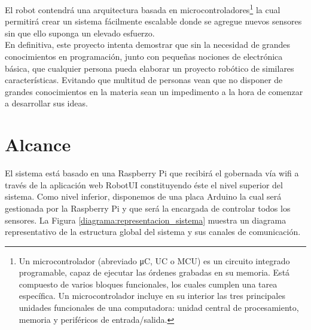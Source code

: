 El robot contendrá una arquitectura basada en microcontroladores\footnote{Un microcontrolador (abreviado μC, UC o MCU) es un circuito integrado programable, capaz de 
ejecutar las órdenes grabadas en su memoria. Está compuesto de varios bloques funcionales, los cuales cumplen una tarea específica. Un microcontrolador incluye en su interior las
tres principales unidades funcionales de una computadora: unidad central de procesamiento, memoria y periféricos de entrada/salida. } la cual permitirá crear un sistema fácilmente escalable donde se agregue nuevos sensores sin que ello suponga 
un elevado esfuerzo.\\

En definitiva, este proyecto intenta demostrar que sin la necesidad de grandes conocimientos en programación, junto con pequeñas nociones de electrónica básica, que cualquier
persona pueda elaborar un proyecto robótico de similares características. Evitando que multitud de personas vean que no disponer de grandes conocimientos en la materia sean un
impedimento a la hora de comenzar a desarrollar sus ideas.\\

\section{Alcance}

El sistema está basado en una Raspberry Pi que recibirá el gobernada vía wifi a través de la aplicación web RobotUI constituyendo éste el nivel superior del sistema. Como nivel inferior, 
disponemos de una placa Arduino la cual será gestionada por la Raspberry Pi y que será la encargada de controlar todos los sensores. La Figura \ref{diagrama:representacion_sistema} muestra un diagrama representativo de la estructura
global del sistema y sus canales de comunicación.\\


